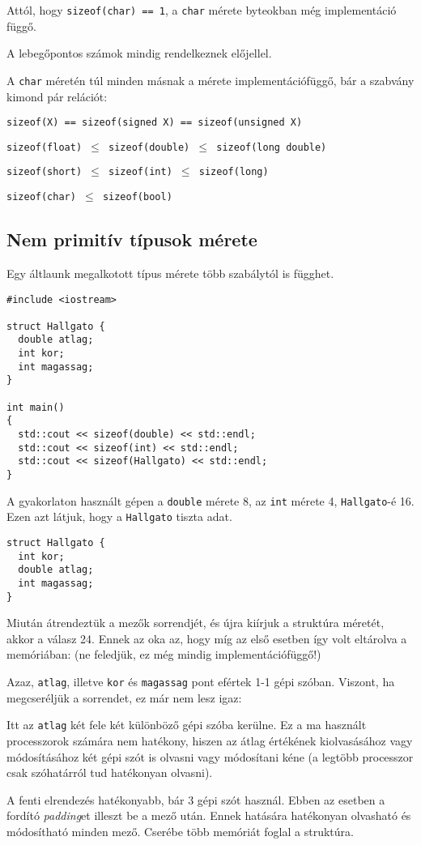 \documentclass[../cpp_book/cpp_book.tex]{subfiles}
\begin{document}
	Attól, hogy \texttt{sizeof(char) == 1}, a \texttt{char} mérete byteokban még implementáció függő.
	
	A lebegőpontos számok mindig rendelkeznek előjellel. 
	
	\medskip
	A \texttt{char} méretén túl minden másnak a mérete implementációfüggő, bár a szabvány kimond pár relációt:
	\begin{center}
		\texttt{sizeof(X) == sizeof(signed X) == sizeof(unsigned X)}
		\smallskip
		
		\texttt{sizeof(float) $\leq$ sizeof(double) $\leq$ sizeof(long double)}
		\smallskip
		
		\texttt{sizeof(short) $\leq$ sizeof(int) $\leq$ sizeof(long)}
		\smallskip
		
		\texttt{sizeof(char) $\leq$ sizeof(bool)}
		\smallskip
	\end{center}
	\subsection{Nem primitív típusok mérete}
	Egy áltlaunk megalkotott típus mérete több szabálytól is függhet.
	\begin{lstlisting}
#include <iostream>

struct Hallgato {
  double atlag;
  int kor;
  int magassag;
}

int main()
{
  std::cout << sizeof(double) << std::endl;
  std::cout << sizeof(int) << std::endl;
  std::cout << sizeof(Hallgato) << std::endl;
}
	\end{lstlisting}
	A gyakorlaton használt gépen a \texttt{double} mérete 8, az \texttt{int} mérete 4, \texttt{Hallgato}-é 16. Ezen azt látjuk, hogy a \texttt{Hallgato} tiszta adat.
	\begin{lstlisting}
struct Hallgato {
  int kor;
  double atlag;
  int magassag;
}
	\end{lstlisting} 
	Miután átrendeztük a mezők sorrendjét, és újra kiírjuk a struktúra méretét, akkor a válasz 24. Ennek az oka az, hogy míg az első esetben így volt eltárolva a memóriában: (ne feledjük, ez még mindig implementációfüggő!)
	\begin{figure}[H]
		\centering
		
	\end{figure}
	Azaz, \texttt{atlag}, illetve \texttt{kor} és \texttt{magassag} pont efértek 1-1 gépi szóban. Viszont, ha megcseréljük a sorrendet, ez már nem lesz igaz:
	\begin{figure}[H]
		\centering
		
	\end{figure}
  Itt az \texttt{atlag} két fele két különböző gépi szóba kerülne. Ez a ma használt processzorok számára nem hatékony, hiszen az átlag értékének kiolvasásához vagy módosításához két gépi szót is olvasni vagy módosítani kéne (a legtöbb processzor csak szóhatárról tud hatékonyan olvasni).
	\begin{figure}[H]
		\centering
		
	\end{figure}
	A fenti elrendezés hatékonyabb, bár 3 gépi szót használ. Ebben az esetben a fordító \textit{padding}et illeszt be a mező után. Ennek hatására hatékonyan olvasható és módosítható minden mező. Cserébe több memóriát foglal a struktúra.
	\smallskip
	
\end{document}
